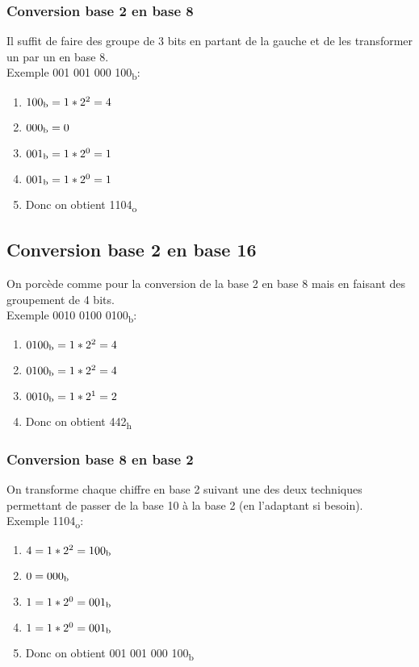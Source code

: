 \documentclass[10pt,a4paper]{article}
\begin{document}
 \subsubsection{Conversion base 2 en base 8}
 Il suffit de faire des groupe de 3 bits en partant de la gauche et de les transformer un par un en base 8.\\
 Exemple 001 001 000 100\textsubscript{b}:

 \begin{enumerate}
	 \item $100\textsubscript{b} = 1*2^2 = 4$
	 \item $000\textsubscript{b} = 0$
	 \item $001\textsubscript{b} = 1*2^0 = 1$
	 \item $001\textsubscript{b} = 1*2^0 = 1$
	 \item Donc on obtient 1104\textsubscript{o}
 \end{enumerate}

 \subsection{Conversion base 2 en base 16}
 On porcède comme pour la conversion de la base 2 en base 8 mais en faisant des groupement de 4 bits.\\
 Exemple 0010 0100 0100\textsubscript{b}:
 \begin{enumerate}
	 \item $0100\textsubscript{b} = 1*2^2 = 4$
	 \item $0100\textsubscript{b} = 1*2^2 = 4$
	 \item $0010\textsubscript{b} = 1*2^1 = 2$
	 \item Donc on obtient 442\textsubscript{h}
 \end{enumerate}

 \subsubsection{Conversion base 8 en base 2}
 On transforme chaque chiffre en base 2 suivant une des deux techniques permettant de passer de la base 10 à la base 2 (en l'adaptant si besoin).\\
 Exemple 1104\textsubscript{o}:
 \begin{enumerate}
	 \item $4 = 1*2^2 = 100\textsubscript{b}$
	 \item $0 = 000\textsubscript{b}$
	 \item $1 = 1*2^0 = 001\textsubscript{b}$
	 \item $1 = 1*2^0 = 001\textsubscript{b}$
	 \item Donc on obtient 001 001 000 100\textsubscript{b}
 \end{enumerate}
\end{document}
